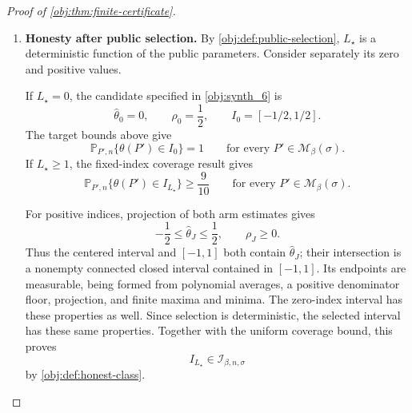 \documentclass[11pt]{article}
\begin{document}
\begin{proof}[Proof of \cref{obj:thm:finite-certificate}]
\begin{enumerate}
The cutoff mean bounds imply
\[
-\frac12\le\theta(P')\le\frac12.
\]
Thus, on \(\Gamma_J\),
\[
\max\{-1,\widehat\theta_J-\rho_J\}
\le\theta(P')
\le\min\{1,\widehat\theta_J+\rho_J\}.
\]
These are precisely the endpoints of \(I_J\) in
\cref{obj:synth_6}. Therefore
\[
\mathbb P_{P',n}\{\theta(P')\in I_J\}\ge\frac9{10}.
\]
Since \(J\ge1\) and \(P'\) were arbitrary, substituting \(J=L\) and \(P'=P\) proves all three fixed-index assertions.

\item \textbf{Honesty after public selection.}
By \cref{obj:def:public-selection}, \(L_\star\) is a deterministic function of the public parameters. Consider separately its zero and positive values.

If \(L_\star=0\), the candidate specified in \cref{obj:synth_6} is
\[
\widehat\theta_0=0,
\qquad
\rho_0=\frac12,
\qquad
I_0=[-1/2,1/2].
\]
The target bounds above give
\[
\mathbb P_{P',n}\{\theta(P')\in I_0\}=1
\qquad\text{for every }P'\in\mathcal M_\beta(\sigma).
\]
If \(L_\star\ge1\), the fixed-index coverage result gives
\[
\mathbb P_{P',n}\{\theta(P')\in I_{L_\star}\}
\ge\frac9{10}
\qquad\text{for every }P'\in\mathcal M_\beta(\sigma).
\]

For positive indices, projection of both arm estimates gives
\[
-\frac12\le\widehat\theta_J\le\frac12,
\qquad
\rho_J\ge0.
\]
Thus the centered interval and \([-1,1]\) both contain
\(\widehat\theta_J\); their intersection is a nonempty connected closed interval contained in \([-1,1]\). Its endpoints are measurable, being formed from polynomial averages, a positive denominator floor, projection, and finite maxima and minima. The zero-index interval has these properties as well. Since selection is deterministic, the selected interval has these same properties. Together with the uniform coverage bound, this proves
\[
I_{L_\star}\in\mathcal I_{\beta,n,\sigma}
\]
by \cref{obj:def:honest-class}.


\end{enumerate}
\end{proof}
\end{document}
